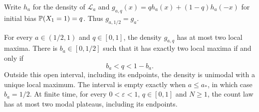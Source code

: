 Write $h_a$ for the density of $\mathcal L_a$ and
$g_{a,q}(x)=q h_a(x)+(1-q)h_a(-x)$ for initial bias
$\mathbb{P}(X_1=1)=q$. Thus $g_{a,1/2}=g_a$.

\begin{theorem}\label{thm:biased-limit-modes}
For every $a\in(1/2,1)$ and $q\in[0,1]$, the density $g_{a,q}$ has at
most two local maxima. There is $b_a\in[0,1/2]$ such that it has exactly
two local maxima if and only if
\[
                 b_a<q<1-b_a.
\]
Outside this open interval, including its endpoints, the density is
unimodal with a unique local maximum. The interval is empty exactly when
$a\le a_*$, in which case $b_a=1/2$.
At finite time, for every $0<\varepsilon<1$, $q\in[0,1]$ and
$N\ge1$, the count law has at most two modal plateaus, including its
endpoints.
\end{theorem}


